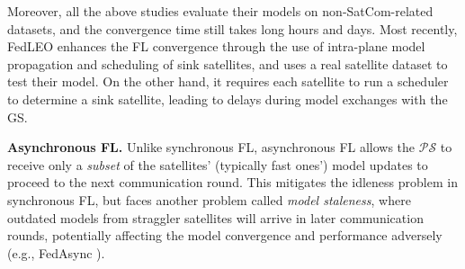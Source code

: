 \documentclass[letter,journal]{IEEEtran}
\newcommand{\red}[1]{\textcolor{red}{[#1]}}
\newcommand{\blue}[1]{\textcolor{blue}{#1}}
\begin{document}
Moreover, all the above studies evaluate their models on non-SatCom-related datasets, and the convergence time still takes long hours and days. Most recently, FedLEO \cite{e2023opt} enhances the FL convergence through the use of intra-plane model propagation and scheduling of sink satellites, and uses a real satellite dataset to test their model. On the other hand, it requires each satellite to run a scheduler to determine a sink satellite, leading to delays during model exchanges with the GS.

{\bf Asynchronous FL.}  Unlike synchronous FL, asynchronous FL allows the $\mathcal {PS}$ to receive only a \textit{subset} of the satellites' (typically fast ones') model updates to proceed to the next communication round. This mitigates the idleness problem in synchronous FL, but faces another problem called \textit{model staleness}, where outdated models from straggler satellites will arrive in later communication rounds, potentially affecting the model convergence and performance adversely (e.g., FedAsync \cite{xie2020asynchronous}).
\end{document}
